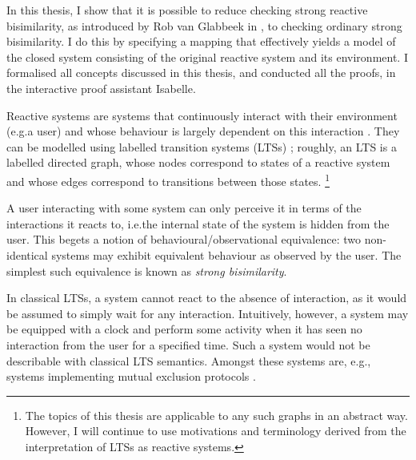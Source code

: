 %
\begin{isabellebody}%
%
%
\isadelimtheory
%
\endisadelimtheory
%
\isatagtheory
%
\endisatagtheory
{\isafoldtheory}%
%
\isadelimtheory
%
\endisadelimtheory
%
\isadelimdocument
%
\endisadelimdocument
%
\isatagdocument
%
\isamarkuptrue%
%
\endisatagdocument
{\isafolddocument}%
%
\isadelimdocument
%
\endisadelimdocument
%
\begin{isamarkuptext}%
\label{chap:introduction}%
\end{isamarkuptext}\isamarkuptrue%
%
\begin{isamarkuptext}%
In this thesis, I show that it is possible to reduce checking strong reactive bisimilarity, as introduced by Rob van Glabbeek in \cite{rbs}, to checking ordinary strong bisimilarity. I do this by specifying a mapping that effectively yields a model of the closed system consisting of the original reactive system and its environment. 
I formalised all concepts discussed in this thesis, and conducted all the proofs, in the interactive proof assistant Isabelle.

Reactive systems are systems that continuously interact with their environment (e.g.\@ a user) and whose behaviour is largely dependent on this interaction \cite{harel85}.
They can be modelled using labelled transition systems (LTSs) \cite{keller76}; roughly, an LTS is a labelled directed graph, whose nodes correspond to states of a reactive system and whose edges correspond to transitions between those states.%
\footnote{The topics of this thesis are applicable to any such graphs in an abstract way. However, I will continue to use motivations and terminology derived from the interpretation of LTSs as reactive systems.}

A user interacting with some system can only perceive it in terms of the interactions it reacts to, i.e.\@ the internal state of the system is hidden from the user. This begets a notion of behavioural/observational equivalence: two non-identical systems may exhibit equivalent behaviour as observed by the user. The simplest such equivalence is known as \emph{strong bisimilarity}.

In classical LTSs, a system cannot react to the absence of interaction, as it would be assumed to simply wait for any interaction. Intuitively, however, a system may be equipped with a clock and perform some activity when it has seen no interaction from the user for a specified time. Such a system would not be describable with classical LTS semantics. Amongst these systems are, e.g., systems implementing mutual exclusion protocols \cite{rbs}.


\end{isamarkuptext}
\end{isabellebody}
